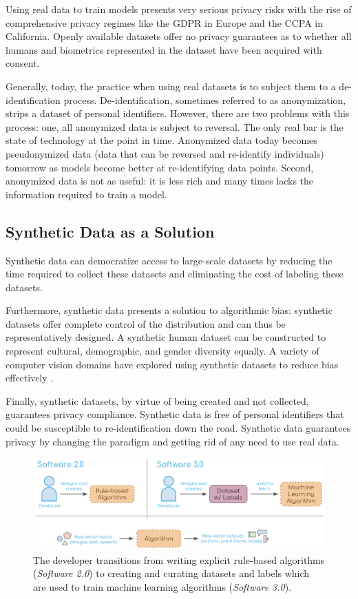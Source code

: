 \documentclass{article}
\begin{document}
Using real data to train models presents very serious privacy risks with the rise of comprehensive privacy regimes like the GDPR in Europe and the CCPA in California. Openly available datasets offer no privacy guarantees as to whether all humans and biometrics represented in the dataset have been acquired with consent. 

Generally, today, the practice when using real datasets is to subject them to a de-identification process. De-identification, sometimes referred to as anonymization, strips a dataset of personal identifiers. However, there are two problems with this process: one, all anonymized data is subject to reversal. The only real bar is the state of technology at the point in time. Anonymized data today becomes pseudonymized data (data that can be reversed and re-identify individuals) tomorrow as models become better at re-identifying data points. Second, anonymized data is not as useful: it is less rich and many times lacks the information required to train a model. 

\subsection{Synthetic Data as a Solution}

Synthetic data can democratize access to large-scale datasets by reducing the time required to collect these datasets and eliminating the cost of labeling these datasets. 

Furthermore, synthetic data presents a solution to algorithmic bias: synthetic datasets offer complete control of the distribution and can thus be representatively designed. A synthetic human dataset can be constructed to represent cultural, demographic, and gender diversity equally.  A variety of computer vision domains have explored using synthetic datasets to reduce bias effectively \cite{DBLP:journals/corr/abs-2004-13866}.

Finally, synthetic datasets, by virtue of being created and not collected, guarantees privacy compliance. Synthetic data is free of personal identifiers that could be susceptible to re-identification down the road. Synthetic data guarantees privacy by changing the paradigm and getting rid of any need to use real data.

\begin{figure}
	\centering
	\includegraphics[width=\textwidth]{software3.png}
	\caption{The developer transitions from writing explicit rule-based algorithms (\emph{Software 2.0}) to creating and curating datasets and labels which are used to train machine learning algorithms (\emph{Software 3.0}).}
	\label{fig:fig2}
\end{figure}
\end{document}
